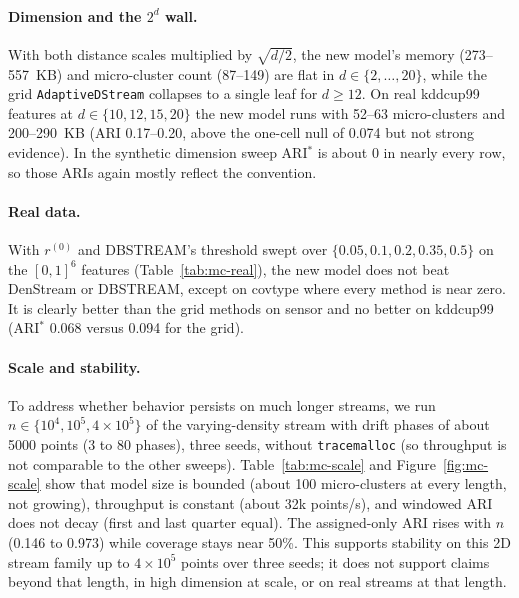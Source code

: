 \documentclass[11pt]{article}
\begin{document}
\paragraph{Dimension and the $2^d$ wall.} With both distance scales multiplied by $\sqrt{d/2}$, the new model's memory (273--557~KB) and micro-cluster count (87--149) are flat in $d \in \{2,\ldots,20\}$, while the grid \texttt{AdaptiveDStream} collapses to a single leaf for $d \geq 12$. On real kddcup99 features at $d \in \{10,12,15,20\}$ the new model runs with 52--63 micro-clusters and 200--290~KB (ARI 0.17--0.20, above the one-cell null of 0.074 but not strong evidence). In the synthetic dimension sweep ARI$^*$ is about 0 in nearly every row, so those ARIs again mostly reflect the convention.

\paragraph{Real data.} With $r^{(0)}$ and DBSTREAM's threshold swept over $\{0.05,0.1,0.2,0.35,0.5\}$ on the $[0,1]^6$ features (Table~\ref{tab:mc-real}), the new model does not beat DenStream or DBSTREAM, except on covtype where every method is near zero. It is clearly better than the grid methods on sensor and no better on kddcup99 (ARI$^*$ 0.068 versus 0.094 for the grid).

\begin{table}[h]
\centering
\caption{Best ARI per family on real streams ($d=6$, $n\approx8000$); ARI$^*$ of the new model in parentheses.}
\label{tab:mc-real}
\end{table}

\paragraph{Scale and stability.} To address whether behavior persists on much longer streams, we run $n \in \{10^4, 10^5, 4\times10^5\}$ of the varying-density stream with drift phases of about 5000 points (3 to 80 phases), three seeds, without \texttt{tracemalloc} (so throughput is not comparable to the other sweeps). Table~\ref{tab:mc-scale} and Figure~\ref{fig:mc-scale} show that model size is bounded (about 100 micro-clusters at every length, not growing), throughput is constant (about 32k points/s), and windowed ARI does not decay (first and last quarter equal). The assigned-only ARI rises with $n$ (0.146 to 0.973) while coverage stays near 50\%. This supports stability on this 2D stream family up to $4\times10^5$ points over three seeds; it does not support claims beyond that length, in high dimension at scale, or on real streams at that length.
\end{document}
